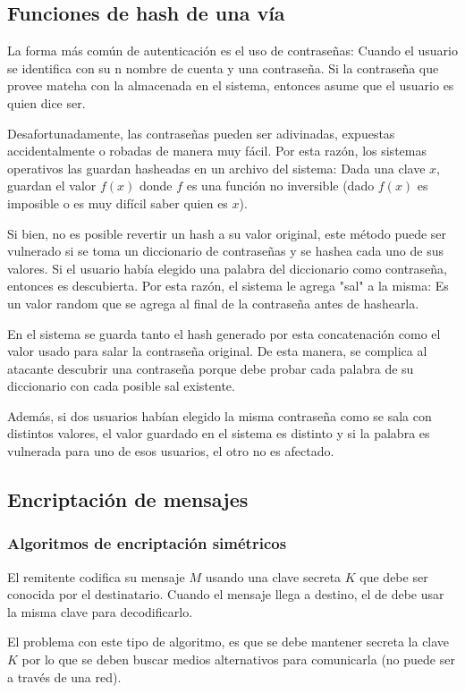 \subsection{Funciones de hash de una vía}
La forma más común de autenticación es el uso de contraseñas: Cuando el usuario se identifica con su n nombre de cuenta y una contraseña. Si la contraseña que provee mateha con la almacenada en el sistema, entonces asume que el usuario es quien dice ser.

Desafortunadamente, las contraseñas pueden ser adivinadas, expuestas accidentalmente o robadas de manera muy fácil. Por esta razón, los sistemas operativos las guardan hasheadas en un archivo del sistema: Dada una clave $x$, guardan el valor $f(x)$ donde $f$ es una función no inversible (dado $f(x)$ es imposible o es muy difícil saber quien es $x$).

Si bien, no es posible revertir un hash a su valor original, este método puede ser vulnerado si se toma un diccionario de contraseñas y se hashea cada uno de sus valores. Si el usuario había elegido una palabra del diccionario como contraseña, entonces es descubierta. Por esta razón, el sistema le agrega "sal" a la misma: Es un valor random que se agrega al final de la contraseña antes de hashearla. 

En el sistema se guarda tanto el hash generado por esta  concatenación como el valor usado para salar la contraseña original. De esta manera, se complica al atacante descubrir una contraseña porque debe probar cada palabra de su diccionario con cada posible sal existente. 

Además, si dos usuarios habían elegido la misma contraseña como se sala con distintos valores, el valor guardado en el sistema es distinto y si la palabra es vulnerada para uno de esos usuarios, el otro no es afectado.

\subsection{Encriptación de mensajes}
\subsubsection{Algoritmos de encriptación simétricos} 
El remitente codifica su mensaje $M$ usando una clave secreta $K$ que debe ser conocida por el destinatario. Cuando el mensaje llega a destino, el de debe usar la misma clave para decodificarlo.

El problema con este tipo de algoritmo, es que se debe mantener secreta la clave $K$ por lo que se deben buscar medios alternativos para comunicarla (no puede ser a través de una red).

